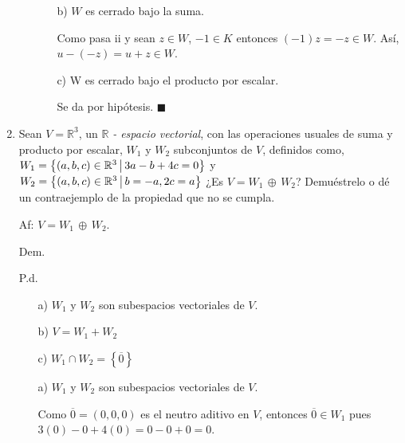 \documentclass[fleqn]{article}
\begin{document}
\begin{enumerate}
\begin{enumerate}
\begin{enumerate}
                \item[b)] $ W $ es cerrado bajo la suma. \par
                Como pasa ii y sean $ z \in W $, $ -1 \in K $ entonces $ (-1)z = -z \in W $. Así, $ u - (-z) = u + z \in W $.

                \item[c)] W es cerrado bajo el producto por escalar. \par
                Se da por hipótesis. $ \blacksquare $
            \end{enumerate}
        \end{enumerate}

        \item Sean $ V = \mathbb{R}^3 $, un $ \mathbb{R} $ \textsl{- espacio vectorial}, con las operaciones usuales de suma y producto por escalar, $ W_1 $ y $ W_2 $ subconjuntos de $ V $, definidos como, $ W_1 = \left \{(a,b,c) \in \mathbb{R}^3 \middle \arrowvert 3a - b + 4c = 0 \right \} $ y $ W_2 = \left \{(a,b,c) \in \mathbb{R}^3 \middle \arrowvert b=-a, 2c=a \right \} $ ¿Es $ V = W_1 \, \oplus \, W_2 $? Demuéstrelo o dé un contraejemplo de la propiedad que no se cumpla.
        
        Af: $ V = W_1 \, \oplus \, W_2 $. \par

        \hspace{2.7mm} Dem. \par

        \begin{minipage}[c]{0.7cm}
            \vspace{-1.7cm} P.d. 
        \end{minipage} \begin{minipage}[b]{9cm}
            \begin{enumerate}
                \item[a)] $ W_1 $ y $ W_2 $ son subespacios vectoriales de $ V $. 
                \item[b)] $ V = W_1 + W_2 $
                \item[c)] $ W_1 \cap W_2 = \left \{\overline{0} \right \} $
            \end{enumerate}
        \end{minipage}
        
        \begin{enumerate}
            \item[a)] $ W_1 $ y $ W_2 $ son subespacios vectoriales de $ V $. \par
            Como $ \overline{0} = (0,0,0) $ es el neutro aditivo en $ V $, entonces $ \overline{0} \in W_1 $ pues $ 3(0) - 0 + 4(0) = 0 - 0 + 0 = 0 $. \par


\end{enumerate}
\end{enumerate}
\end{document}
